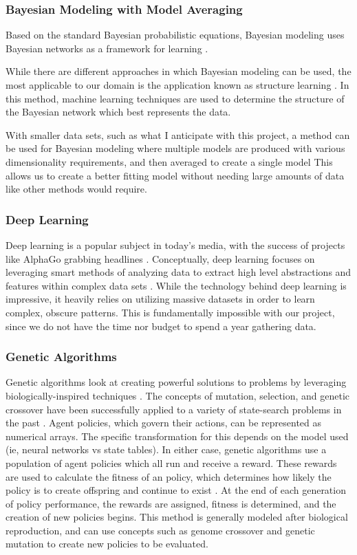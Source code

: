 \documentclass[draftclsnofoot,onecolumn,letterpaper,10pt]{IEEEtran}
\begin{document}
\subsubsection{Bayesian Modeling with Model Averaging}
Based on the standard Bayesian probabilistic equations, Bayesian modeling uses Bayesian networks as a framework for learning \cite{RussellNorvig}.

While there are different approaches in which Bayesian modeling can be used, the most applicable to our domain is the application known as structure learning \cite{RussellNorvig}.
In this method, machine learning techniques are used to determine the structure of the Bayesian network which best represents the data.

With smaller data sets, such as what I anticipate with this project, a method can be used for Bayesian modeling where multiple models are produced with various dimensionality requirements, and then averaged to create a single model \cite{RussellNorvig}
This allows us to create a better fitting model without needing large amounts of data like other methods would require.

\subsubsection{Deep Learning}
Deep learning is a popular subject in today's media, with the success of projects like AlphaGo grabbing headlines \cite{alphago}.
Conceptually, deep learning focuses on leveraging smart methods of analyzing data to extract high level abstractions and features within complex data sets \cite{Goodfellow-et-al-2016-Book}.
While the technology behind deep learning is impressive, it heavily relies on utilizing massive datasets in order to learn complex, obscure patterns.
This is fundamentally impossible with our project, since we do not have the time nor budget to spend a year gathering data.

\subsubsection{Genetic Algorithms}
Genetic algorithms look at creating powerful solutions to problems by leveraging biologically-inspired techniques \cite{RussellNorvig}.
The concepts of mutation, selection, and genetic crossover have been successfully applied to a variety of state-search problems in the past \cite{RussellNorvig}.
Agent policies, which govern their actions, can be represented as numerical arrays.
The specific transformation for this depends on the model used (ie, neural networks vs state tables).
In either case, genetic algorithms use a population of agent policies which all run and receive a reward.
These rewards are used to calculate the fitness of an policy, which determines how likely the policy is to create offspring and continue to exist \cite{RussellNorvig}.
At the end of each generation of policy performance, the rewards are assigned, fitness is determined, and the creation of new policies begins.
This method is generally modeled after biological reproduction, and can use concepts such as genome crossover and genetic mutation to create new policies to be evaluated.
\end{document}
